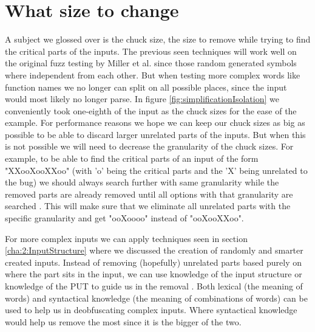 \section{What size to change}
\label{cha:3:Chucksize}
A subject we glossed over is the chuck size, the size to remove while trying to find the critical parts of the inputs. 
The previous seen techniques will work well on the original fuzz testing by Miller et al. \cite{4originalFuzzingUnixUtils} since those random generated symbols where independent from each other. But when testing more complex words like function names we no longer can split on all possible places, since the input would most likely no longer parse. 
In figure \ref{fig:simplificationIsolation} we conveniently took one-eighth of the input as the chuck sizes for the ease of the example. For performance reasons we hope we can keep our chuck sizes as big as possible to be able to discard larger unrelated parts of the inputs. But when this is not possible we will need to decrease the granularity of the chuck sizes.
For example, to be able to find the critical parts of an input of the form "XXooXooXXoo" (with 'o' being the critical parts and the 'X' being unrelated to the bug) we should always search further with same granularity while the removed parts are already removed until all options with that granularity are searched \cite{bookZellerwhyProgramsFail}. This will make sure that we eliminate all unrelated parts with the specific granularity and get "ooXoooo" instead of "ooXooXXoo". 

For more complex inputs we can apply techniques seen in section \ref{cha:2:InputStructure} where we discussed the creation of randomly and smarter created inputs. Instead of removing (hopefully) unrelated parts based purely on where the part sits in the input, we can use knowledge of the input structure or knowledge of the PUT to guide us in the removal \cite{bookZellerwhyProgramsFail}. Both lexical (the meaning of words) and syntactical knowledge (the meaning of combinations of words) can be used to help us in deobfuscating complex inputs. Where syntactical knowledge would help us remove the most since it is the bigger of the two.

